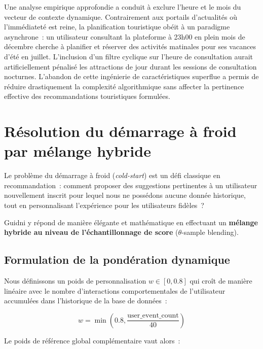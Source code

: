 Une analyse empirique approfondie a conduit à exclure l'heure et le mois du vecteur de contexte dynamique. Contrairement aux portails d'actualités où l'immédiateté est reine, la planification touristique obéit à un paradigme asynchrone~: un utilisateur consultant la plateforme à 23h00 en plein mois de décembre cherche à planifier et réserver des activités matinales pour ses vacances d'été en juillet. L'inclusion d'un filtre cyclique sur l'heure de consultation aurait artificiellement pénalisé les attractions de jour durant les sessions de consultation nocturnes. L'abandon de cette ingénierie de caractéristiques superflue a permis de réduire drastiquement la complexité algorithmique sans affecter la pertinence effective des recommandations touristiques formulées.

\section{Résolution du démarrage à froid par mélange hybride}

Le problème du démarrage à froid (\textit{cold-start}) est un défi classique en recommandation~: comment proposer des suggestions pertinentes à un utilisateur nouvellement inscrit pour lequel nous ne possédons aucune donnée historique, tout en personnalisant l'expérience pour les utilisateurs fidèles~?

Guidni y répond de manière élégante et mathématique en effectuant un \textbf{mélange hybride au niveau de l'échantillonnage de score} ($\theta$-sample blending).

\subsection{Formulation de la pondération dynamique}

Nous définissons un poids de personnalisation $w \in [0, 0.8]$ qui croît de manière linéaire avec le nombre d'interactions comportementales de l'utilisateur accumulées dans l'historique de la base de données~:

\begin{equation}
    w = \min\left(0.8, \frac{\text{user\_event\_count}}{40}\right)
    \label{eq:blending_weight}
\end{equation}

Le poids de référence global complémentaire vaut alors~:

